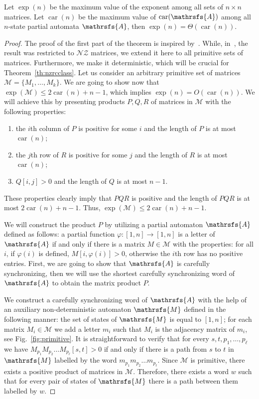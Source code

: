 \documentclass[a4paper,USenglish]{lipics}
\DeclareMathOperator{\car}{car}
\theoremstyle{definition}
\begin{document}
\begin{theorem}
\label{th:expcar}
Let $\exp (n)$ be the maximum value of the exponent among all sets of $n \times n$ matrices. Let $\car(n)$ be the maximum value of $\car(\mathrsfs{A})$ among all $n$-state partial automata $\mathrsfs{A}$, then $\exp(n) = \Theta(\car(n))$.
\end{theorem}
\begin{proof}
The proof of the first part of the theorem is inspired by~\cite[Theorem 16]{BJO15}. 
While, in~\cite{BJO15}, the result was restricted to $\mathscr{NZ}$ matrices, we extend it here to all primitive sets of matrices.  
Furthermore, we make it deterministic, which will be crucial for Theorem~\ref{th:nzrcclass}.
Let us consider an arbitrary primitive set of matrices $\mathcal{M} = \{ M_1, \ldots, M_k \}$. We are going to show now that $\exp(\mathcal{M}) \leq 2\car(n) + n-1$, which implies $\exp(n)=O(\car(n))$. 
We will achieve this by presenting products $P,Q,R$ of matrices in $\mathcal{M}$ with the following properties: 
\begin{enumerate}
\item the $i$th column of $P$ is positive for some $i$ and the length of $P$ is at most $\car(n)$;
\item the $j$th row of $R$ is positive for some $j$ and the length of $R$ is at most $\car(n)$;
\item $Q[i,j]>0$ and the length of $Q$ is at most $n-1$.
\end{enumerate}
These properties clearly imply that $PQR$ is positive and the length of $PQR$ is at most $2\car(n) + n-1$. Thus, $\exp(\mathcal{M}) \leq 2\car(n) + n-1$.


We will construct the product $P$ by utilizing a partial automaton $\mathrsfs{A}$ defined as follows: a partial function $\varphi: [1,n] \rightarrow [1,n]$ is a letter of $\mathrsfs{A}$ if and only if there is a matrix $M \in \mathcal{M}$ with the properties: for all $i$, if $\varphi(i)$ is defined, $M[i, \varphi(i)]>0$, otherwise the $i$th row has no positive entries. First, we are going to show that $\mathrsfs{A}$ is carefully synchronizing, then we will use the shortest carefully synchronizing word of $\mathrsfs{A}$ to obtain the matrix product $P$.

We construct a carefully synchronizing word of $\mathrsfs{A}$ with the help of an auxiliary non-deterministic automaton $\mathrsfs{M}$ defined in the following manner:  the set of states of $\mathrsfs{M}$ is equal to $[1,n]$; for each matrix $M_i \in \mathcal{M}$ we add a letter $m_i$ such that $M_i$ is the adjacency matrix of $m_i$, see Fig.~\ref{fig:primitive}. It is straightforward to verify that for every $s,t,p_1, \ldots, p_\ell$ we have $M_{p_1}M_{p_2}\ldots M_{p_\ell}[s,t] >0$ if and only if there is a path from $s$ to $t$ in $\mathrsfs{M}$ labelled by the word $m_{p_1}m_{p_2}\ldots m_{p_\ell}$. Since $\mathcal{M}$ is primitive, there exists a positive product of matrices in $\mathcal{M}$. Therefore, there exists a word $w$ such that for every pair of states of $\mathrsfs{M}$ there is a path between them labelled by $w$. 


\end{proof}
\end{document}
